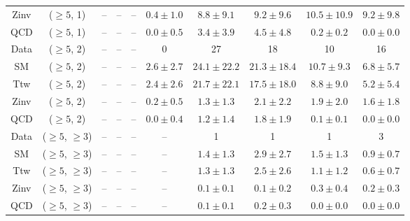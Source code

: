 \begin{table}[h!]
{\begin{tabular}{cccccccccc}
	Zinv & ($\ge5$, 1) & -- & -- & -- & $0.4\pm 1.0$ & $8.8\pm 9.1$ & $9.2\pm 9.6$ & $10.5\pm 10.9$ & $9.2\pm 9.8$ \\[0.5ex] 
	QCD & ($\ge5$, 1) & -- & -- & -- & $0.0\pm 0.5$ & $3.4\pm 3.9$ & $4.5\pm 4.8$ & $0.2\pm 0.2$ & $0.0\pm 0.0$ \\[0.5ex] 
	Data & ($\ge5$, 2) & -- & -- & -- & 0 & 27 & 18 & 10 & 16 \\[0.5ex] 
	SM & ($\ge5$, 2) & -- & -- & -- & $2.6\pm 2.7$ & $24.1\pm 22.2$ & $21.3\pm 18.4$ & $10.7\pm 9.3$ & $6.8\pm 5.7$ \\[0.5ex] 
	Ttw & ($\ge5$, 2) & -- & -- & -- & $2.4\pm 2.6$ & $21.7\pm 22.1$ & $17.5\pm 18.0$ & $8.8\pm 9.0$ & $5.2\pm 5.4$ \\[0.5ex] 
	Zinv & ($\ge5$, 2) & -- & -- & -- & $0.2\pm 0.5$ & $1.3\pm 1.3$ & $2.1\pm 2.2$ & $1.9\pm 2.0$ & $1.6\pm 1.8$ \\[0.5ex] 
	QCD & ($\ge5$, 2) & -- & -- & -- & $0.0\pm 0.4$ & $1.2\pm 1.4$ & $1.8\pm 1.9$ & $0.1\pm 0.1$ & $0.0\pm 0.0$ \\[0.5ex] 
	Data & ($\ge5$, $\ge3$) & -- & -- & -- & -- & 1 & 1 & 1 & 3 \\[0.5ex] 
	SM & ($\ge5$, $\ge3$) & -- & -- & -- & -- & $1.4\pm 1.3$ & $2.9\pm 2.7$ & $1.5\pm 1.3$ & $0.9\pm 0.7$ \\[0.5ex] 
	Ttw & ($\ge5$, $\ge3$) & -- & -- & -- & -- & $1.3\pm 1.3$ & $2.5\pm 2.6$ & $1.1\pm 1.2$ & $0.6\pm 0.7$ \\[0.5ex] 
	Zinv & ($\ge5$, $\ge3$) & -- & -- & -- & -- & $0.1\pm 0.1$ & $0.1\pm 0.2$ & $0.3\pm 0.4$ & $0.2\pm 0.3$ \\[0.5ex] 
	QCD & ($\ge5$, $\ge3$) & -- & -- & -- & -- & $0.1\pm 0.1$ & $0.2\pm 0.3$ & $0.0\pm 0.0$ & $0.0\pm 0.0$ \\[0.5ex] 
	\hline
	\hline
\end{tabular}}
\end{table}
